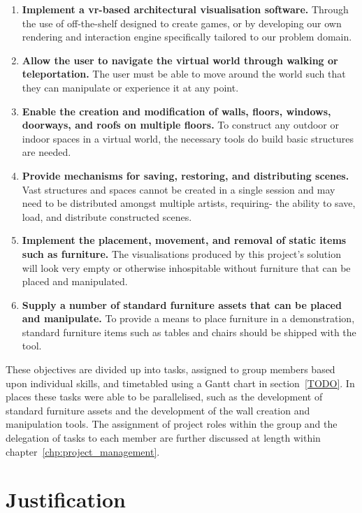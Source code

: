     \begin{enumerate}
        \item{\textbf{Implement a \acrshort{vr}-based architectural visualisation software.}} Through the use of off-the-shelf  designed to create games, or by developing our own rendering and interaction engine specifically tailored to our problem domain.
        \item{\textbf{Allow the user to navigate the virtual world through walking or teleportation.}} The user must be able to move around the world such that they can manipulate or experience it at any point.
        \item{\textbf{Enable the creation and modification of walls, floors, windows, doorways, and roofs on multiple floors.}} To construct any outdoor or indoor spaces in a virtual world, the necessary tools do build basic structures are needed.
        \item{\textbf{Provide mechanisms for saving, restoring, and distributing scenes.}} Vast structures and spaces cannot be created in a single session and may need to be distributed amongst multiple artists, requiring- the ability to save, load, and distribute constructed scenes.
        \item{\textbf{Implement the placement, movement, and removal of static items such as furniture.}} The visualisations produced by this project's solution will look very empty or otherwise inhospitable without furniture that can be placed and manipulated.
        \item{\textbf{Supply a number of standard furniture assets that can be placed and manipulate.}} To provide a means to place furniture in a demonstration, standard furniture items such as tables and chairs should be shipped with the tool.
    \end{enumerate}
    
    These objectives are divided up into tasks, assigned to group members based upon individual skills, and timetabled using a Gantt chart in section~\ref{TODO}. In places these tasks were able to be parallelised, such as the development of standard furniture assets and the development of the wall creation and manipulation tools. The assignment of project roles within the group and the delegation of tasks to each member are further discussed at length within chapter~\ref{chp:project_management}.

\section{Justification}

